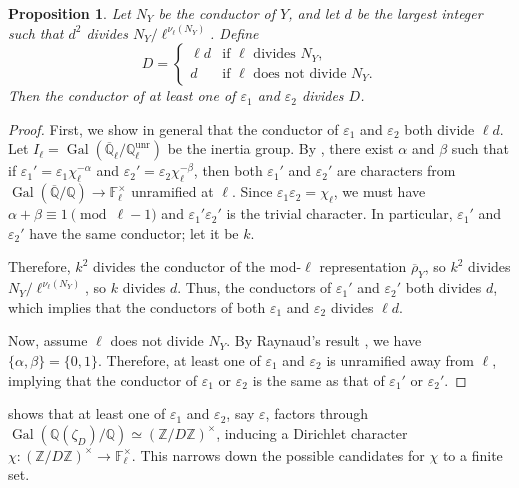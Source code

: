 \documentclass{amsproc}
\numberwithin{equation}{section}
\newtheorem{proposition}[equation]{Proposition}
\theoremstyle{definition}
\theoremstyle{remark}
\DeclareMathOperator{\Gal}{Gal}
\newcommand{\eps}{\varepsilon}
\newcommand{\ZZ}{\mathbb Z}
\newcommand{\QQ}{\mathbb Q}
\newcommand{\FF}{\mathbb F}
\newcommand{\Qbar}{\overline{\QQ}}
\newcommand{\GalQ}{\Gal(\Qbar/\QQ)}
\begin{document}
\begin{proposition}
    \label{prop:finite_conductor}
    Let $N_Y$ be the conductor of $Y$, and let
    $d$ be the largest integer such that $d^2$ divides $N_Y/\ell^{\nu_\ell(N_Y)}$. Define
    \begin{equation}
    \label{eq:conductor_bound}
    D = \begin{cases}
        \ell d & \text{if }\ell \text{ divides } N_Y, \\
        d & \text{if }\ell \text{ does not divide } N_Y.
    \end{cases}
\end{equation}
    Then the conductor of at least one of $\eps_1$ and $\eps_2$ divides $D$.
\end{proposition}
\begin{proof}
    First, we show in general that the conductor of $\eps_1$ and $\eps_2$ both divide $\ell d$.
    Let $I_\ell = \Gal(\Qbar_\ell / \QQ_\ell^{\text{unr}})$
    be the inertia group.
    By \cite[\S 2.3]{serre}, there exist $\alpha$ and $\beta$ such that if $\eps_1' = \eps_1\chi_\ell^{-\alpha}$ and $\eps_2' = \eps_2\chi_\ell^{-\beta}$, then
    both $\eps_1'$ and $\eps_2'$ are characters from $\GalQ\to\FF_\ell^\times$ unramified at $\ell$.
    Since $\eps_1\eps_2 = \chi_\ell$, we must have 
    $\alpha+\beta\equiv 1\pmod{\ell-1}$
    and $\eps_1' \eps_2'$ is the trivial character.
    In particular, $\eps_1'$ and $\eps_2'$ have the same conductor; let it be $k$.
    
    Therefore, $k^2$ divides the conductor of the mod-$\ell$ representation $\overline\rho_Y$, so $k^2$ divides $N_Y/\ell^{\nu_\ell(N_Y)}$, so $k$ divides $d$.
    Thus, the conductors of $\eps_1'$ and $\eps_2'$ both divides $d$, which implies that the conductors of both $\eps_1$ and $\eps_2$ divides $\ell d$.

    Now, assume $\ell$ does not divide $N_Y$. By Raynaud's result \cite[Cor.~3.4.4]{raynaud}, we have $\{\alpha,\beta\} = \{0,1\}$. Therefore, at least one of $\eps_1$ and $\eps_2$ is unramified away from $\ell$, implying that the conductor of $\eps_1$ or $\eps_2$ is the same as that of $\eps_1'$ or $\eps_2'$.
\end{proof}

 shows that at least one of $\eps_1$ and $\eps_2$, say $\eps$, factors through $\Gal(\QQ(\zeta_D)/\QQ) \simeq (\ZZ/D\ZZ)^\times$, inducing a Dirichlet character $\chi : (\ZZ/D\ZZ)^\times \to \FF_\ell^\times$. This narrows down the possible candidates for $\chi$ to a finite set.
\end{document}
